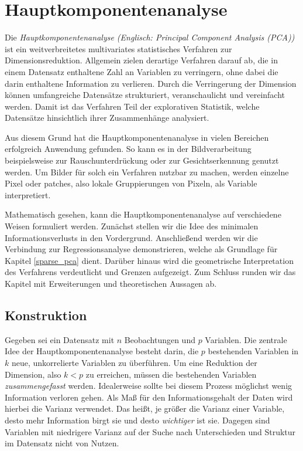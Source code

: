 \chapter{Hauptkomponentenanalyse}

\label{pca}

Die \textit{Hauptkomponentenanalyse (Englisch: Principal Component Analysis (PCA))} ist ein weitverbreitetes multivariates statistisches Verfahren zur Dimensionsreduktion. Allgemein zielen derartige Verfahren darauf ab, die in einem Datensatz enthaltene Zahl an Variablen zu verringern, ohne dabei die darin enthaltene Information zu verlieren. Durch die Verringerung der Dimension können umfangreiche Datensätze strukturiert, veranschaulicht und vereinfacht werden. Damit ist das Verfahren Teil der explorativen Statistik, welche Datensätze hinsichtlich ihrer Zusammenhänge analysiert.

Aus diesem Grund hat die Hauptkomponentenanalyse in vielen Bereichen erfolgreich Anwendung gefunden. So kann es in der Bildverarbeitung beispielsweise zur Rauschunterdrückung \cite{babu} oder zur Gesichtserkennung \cite{jiang} genutzt werden. Um Bilder für solch ein Verfahren nutzbar zu machen, werden einzelne Pixel oder patches, also lokale Gruppierungen von Pixeln, als Variable interpretiert. 

Mathematisch gesehen, kann die Hauptkomponentenanalyse auf verschiedene Weisen formuliert werden. Zunächst stellen wir die Idee des minimalen Informationsverlusts in den Vordergrund. Anschließend werden wir die Verbindung zur Regressionsanalyse demonstrieren, welche als Grundlage für Kapitel \ref{sparse_pca} dient. Darüber hinaus wird die geometrische Interpretation des Verfahrens verdeutlicht und Grenzen aufgezeigt. Zum Schluss runden wir das Kapitel mit Erweiterungen und theoretischen Aussagen ab.




\section{Konstruktion}

Gegeben sei ein Datensatz mit $n$ Beobachtungen und $p$ Variablen. Die zentrale Idee der Hauptkomponentenanalyse besteht darin, die $p$ bestehenden Variablen in $k$ neue, unkorrelierte Variablen zu überführen. Um eine Reduktion der Dimension, also $k < p$ zu erreichen, müssen die bestehenden Variablen \textit{zusammengefasst} werden. Idealerweise sollte bei diesem Prozess möglichst wenig Information verloren gehen. Als Maß für den Informationsgehalt der Daten wird hierbei die Varianz verwendet. Das heißt, je größer die Varianz einer Variable, desto mehr Information birgt sie und desto \textit{wichtiger} ist sie. Dagegen sind Variablen mit niedrigere Varianz auf der Suche nach Unterschieden und Struktur im Datensatz nicht von Nutzen. 

